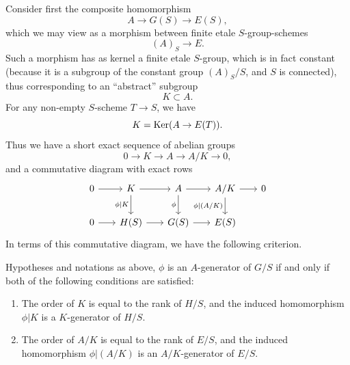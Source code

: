 Consider first the composite homomorphism
\begin{equation}\label{eq:1.11.1.3}
A \longrightarrow G(S) \longrightarrow E(S),
\end{equation}
which we may view as a morphism between finite etale $S$-group-schemes
\begin{equation}\label{eq:1.11.1.4}
(A)_S \longrightarrow E.
\end{equation}
Such a morphism has as kernel a finite etale $S$-group, which is in fact constant (because it is a subgroup of the constant group $(A)_S/S$, and $S$ is connected), thus corresponding to an ``abstract'' subgroup
\begin{equation}\label{eq:1.11.1.5}
K \subset A.
\end{equation}
For any non-empty $S$-scheme $T \to S$, we have
\begin{equation}\label{eq:1.11.1.6}
K = \operatorname{Ker}(A \to E(T)).
\end{equation}
Thus we have a short exact sequence of abelian groups
\begin{equation}\label{eq:1.11.1.7}
0 \longrightarrow K \longrightarrow A \longrightarrow A/K \longrightarrow 0,
\end{equation}
and a commutative diagram with exact rows
\begin{equation}\label{eq:1.11.1.8}
\begin{tikzcd}[column sep=scriptsize]
0 \arrow[r] & K \arrow[r] \arrow[d, "\phi|K"'] & A \arrow[r] \arrow[d, "\phi"'] & A/K \arrow[r] \arrow[d, "\phi|(A/K)"'] & 0 \\
0 \arrow[r] & H(S) \arrow[r] & G(S) \arrow[r] & E(S)
\end{tikzcd}
\end{equation}
In terms of this commutative diagram, we have the following criterion.

\begin{proposition}\label{prop:1.11.2}
Hypotheses and notations as above, $\phi$ is an $A$-generator of $G/S$ if and only if both of the following conditions are satisfied:
\begin{enumerate}[(1)]
\item The order of $K$ is equal to the rank of $H/S$, and the induced homomorphism $\phi|K$ is a $K$-generator of $H/S$.
\item The order of $A/K$ is equal to the rank of $E/S$, and the induced homomorphism $\phi|(A/K)$ is an $A/K$-generator of $E/S$.
\end{enumerate}
\end{proposition}

